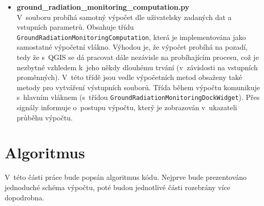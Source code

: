 \begin{itemize}
	\item \textbf{ground\_radiation\_monitoring\_computation.py}
\\ V~souboru probíhá samotný výpočet dle uživatelsky zadaných dat a
vstupních parametrů. Obsahuje třídu
\texttt{GroundRadiationMonitoringComputation}, která je implementována
jako samostatné výpočetní vlákno. Výhodou je, že výpočet probíhá na
pozadí, tedy že s~QGIS se dá pracovat dále nezávisle na probíhajícím
procesu, což je nezbytné vzhledem k~jeho někdy dlouhému trvání
(v~závislosti na vstupních proměnných). V~této třídě jsou vedle
výpočetních metod obsaženy také metody pro vytváření výstupních
souborů. Třída během výpočtu komunikuje s~hlavním vláknem (s~třídou
\texttt{GroundRadiationMonitoringDockWidget}). Přes signály informuje
o~postupu výpočtu, který je zobrazován v~ukazateli průběhu výpočtu.
	
\end{itemize}

\newpage
\section{Algoritmus} V~této části práce bude popsán algoritmus
kódu. Nejprve bude prezentováno jednoduché schéma výpočtu, poté budou
jednotlivé části rozebrány více dopodrobna.
